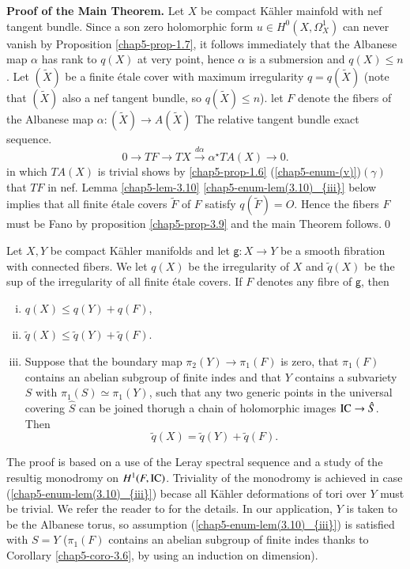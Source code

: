 \medskip
\noindent
{\bf Proof of the Main Theorem.}
Let $X$ be compact K\"ahler mainfold with nef tangent bundle. Since a son zero holomorphic form $u \in H^{0}(X, \Omega_{X}^{1})$ can never vanish by Proposition \ref{chap5-prop-1.7}, it follows immediately that the Albanese map $\alpha$ has rank to $q(X)$ at very point, hence $\alpha$ is a submersion and $q(X) \leq n$. Let $(\widetilde{X})$ be a finite
\'etale cover with maximum irregularity $q=q(\widetilde{X})$ (note that $(\widetilde{X})$ also a nef tangent bundle, so $q(\widetilde{X})\leq n$). let $F$ denote the fibers of the Albanese map $\alpha : (\widetilde{X}) \rightarrow A(\widetilde{X})$ The relative tangent bundle exact sequence. 
$$
0 \rightarrow TF \rightarrow TX \xrightarrow{d\alpha} \alpha^{\star}TA(X)\rightarrow 0.
$$
in which $TA(X)$ is trivial shows by \ref{chap5-prop-1.6} (\ref{chap5-enum-(v)})$(\gamma)$ that $TF$ in nef. Lemma
\ref{chap5-lem-3.10} \eqref{chap5-enum-lem(3.10)_{iii}} below implies that all finite \'etale covers $\widetilde{F}$ of $F$ satisfy $q(\widetilde{F}) = O$. Hence the fibers $F$ must be Fano by proposition \ref{chap5-prop-3.9} and the main Theorem follows.\hfill\qed   

\begin{seclem}\label{chap5-lem-3.10}
Let $X, Y$ be compact K\"ahler manifolds and let $\mathsf{g}: X\rightarrow Y$ be a smooth fibration with connected fibers. We let $q(X)$ be the irregularity of $X$ and $\widetilde{q}(X)$ be the sup of the irregularity of all finite \'etale covers. If $F$ denotes any fibre of $\mathsf{g}$, then
 \begin{enumerate}[(i)]
 \item $q(X) \leq q(Y) + q(F)$,\pageoriginale\label{chap5-enum-lem(3.10)_{i}}
 \item $\widetilde{q}(X) \leq \widetilde{q}(Y) + \widetilde{q}(F)$.\label{chap5-enum-lem(3.10)_{ii}}
 \item Suppose that the boundary map $\pi_{2}(Y) \rightarrow \pi_{1}(F)$ is zero, that $\pi_{1}(F)$ contains an abelian subgroup of finite indes and that $Y$ contains a subvariety $S$ with $\pi_{1}(S)\simeq \pi_{1}(Y)$, such that any two generic points in the universal covering $\hat{S}$ can be joined thorugh a chain of holomorphic images $\operatorname{IC} \rightarrow \hat{S}$. Then\label{chap5-enum-lem(3.10)_{iii}}
 $$
 \widetilde{q}(X) = \widetilde{q}(Y) + \widetilde{q}(F).
 $$ 
 \end{enumerate}
\end{seclem}

The proof is based on a use of the Leray spectral sequence and a study of the resultig monodromy on $H^{1}(F, \operatorname{IC})$. Triviality of the monodromy is achieved in case (\ref{chap5-enum-lem(3.10)_{iii}}) becase all K\"ahler deformations of tori over $Y$ must be trivial. We refer the reader to \cite{chap5-keyDPS91} for the details. In our application, $Y$ is taken to be the Albanese torus, so assumption (\ref{chap5-enum-lem(3.10)_{iii}}) is satisfied with $S=Y$ ($\pi_{1}(F)$ contains an abelian subgroup of finite indes thanks to Corollary \ref{chap5-coro-3.6}, by using an induction on dimension). 

